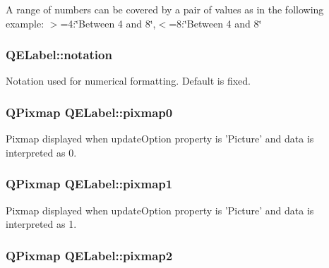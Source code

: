 A range of numbers can be covered by a pair of values as in the following example: $>$=4:\char`\"{}Between 4 and 8\char`\"{},$<$=8:\char`\"{}Between 4 and 8\char`\"{} \hypertarget{classQELabel_a82cd9d9a32b2a4b39b3f0ee0c103c2be}{
\subsubsection[{notation}]{ QELabel::notation}}
\label{classQELabel_a82cd9d9a32b2a4b39b3f0ee0c103c2be}
Notation used for numerical formatting. Default is fixed. \hypertarget{classQELabel_ad99c4d55198c39bea42eb391c71e29aa}{
\subsubsection[{pixmap0}]{\setlength{\rightskip}{0pt plus 5cm}QPixmap QELabel::pixmap0}}
\label{classQELabel_ad99c4d55198c39bea42eb391c71e29aa}
Pixmap displayed when updateOption property is 'Picture' and data is interpreted as 0. \hypertarget{classQELabel_a825fa1c02e643af57502d686354712cc}{
\subsubsection[{pixmap1}]{\setlength{\rightskip}{0pt plus 5cm}QPixmap QELabel::pixmap1}}
\label{classQELabel_a825fa1c02e643af57502d686354712cc}
Pixmap displayed when updateOption property is 'Picture' and data is interpreted as 1. \hypertarget{classQELabel_ac325b3d9005dd3e7747d9124a8b7618c}{
\subsubsection[{pixmap2}]{\setlength{\rightskip}{0pt plus 5cm}QPixmap QELabel::pixmap2}}
\label{classQELabel_ac325b3d9005dd3e7747d9124a8b7618c}
